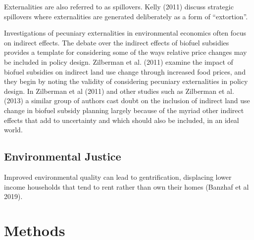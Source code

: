 \documentclass[ecta,nameyear,draft]{econsocart}
\theoremstyle{plain}
\theoremstyle{remark}
\begin{document}
Externalities are also referred to as spillovers. Kelly (2011) discuss strategic spillovers where externalities are generated deliberately as a form of “extortion”. 

Investigations of pecuniary externalities in environmental economics often focus on indirect effects. The debate over the indirect effects of biofuel subsidies provides a template for considering some of the ways relative price changes may be included in policy design. Zilberman et al. (2011) examine the impact of biofuel subsidies on indirect land use change through increased food prices, and they begin by noting the validity of considering pecuniary externalities in policy design. In Zilberman et al (2011) and other studies such as Zilberman et al. (2013) a similar group of authors cast doubt on the inclusion of indirect land use change in biofuel subsidy planning largely because of the myriad other indirect effects that add to uncertainty and which should also be included, in an ideal world. 





\subsection{Environmental Justice} 

Improved environmental quality can lead to gentrification, displacing lower income households that tend to rent rather than own their homes (Banzhaf et al 2019). 	 





\section{Methods}
\end{document}
